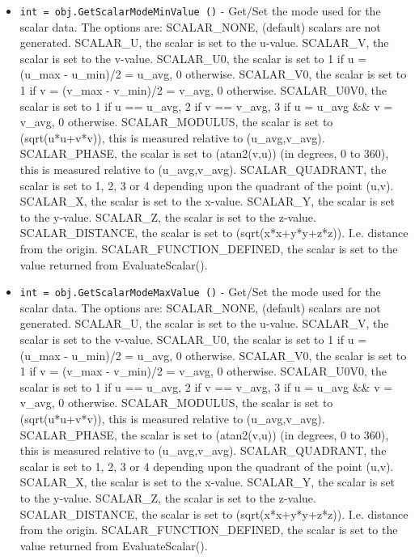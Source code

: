 \begin{itemize}
\item  \verb|int = obj.GetScalarModeMinValue ()| -  Get/Set the mode used for the scalar data.  The options are:
 SCALAR\_NONE, (default) scalars are not generated.
 SCALAR\_U, the scalar is set to the u-value. 
 SCALAR\_V, the scalar is set to the v-value.
 SCALAR\_U0, the scalar is set to 1 if u = (u\_max - u\_min)/2 = u\_avg, 0 otherwise.
 SCALAR\_V0, the scalar is set to 1 if v = (v\_max - v\_min)/2 = v\_avg, 0 otherwise.
 SCALAR\_U0V0, the scalar is 
   set to 1 if u == u\_avg, 2 if v == v\_avg, 3 if u = u\_avg \&\& v = v\_avg, 0 otherwise.
 SCALAR\_MODULUS, the scalar is set to (sqrt(u*u+v*v)), this is measured relative to (u\_avg,v\_avg).
 SCALAR\_PHASE, the scalar is set to (atan2(v,u)) (in degrees, 0 to 360), this is measured relative to (u\_avg,v\_avg).
 SCALAR\_QUADRANT, the scalar is set to 1, 2, 3 or 4 
   depending upon the quadrant of the point (u,v).
 SCALAR\_X, the scalar is set to the x-value. 
 SCALAR\_Y, the scalar is set to the y-value. 
 SCALAR\_Z, the scalar is set to the z-value. 
 SCALAR\_DISTANCE, the scalar is set to (sqrt(x*x+y*y+z*z)). I.e. distance from the origin.
 SCALAR\_FUNCTION\_DEFINED, the scalar is set to the value returned from EvaluateScalar().

\item  \verb|int = obj.GetScalarModeMaxValue ()| -  Get/Set the mode used for the scalar data.  The options are:
 SCALAR\_NONE, (default) scalars are not generated.
 SCALAR\_U, the scalar is set to the u-value. 
 SCALAR\_V, the scalar is set to the v-value.
 SCALAR\_U0, the scalar is set to 1 if u = (u\_max - u\_min)/2 = u\_avg, 0 otherwise.
 SCALAR\_V0, the scalar is set to 1 if v = (v\_max - v\_min)/2 = v\_avg, 0 otherwise.
 SCALAR\_U0V0, the scalar is 
   set to 1 if u == u\_avg, 2 if v == v\_avg, 3 if u = u\_avg \&\& v = v\_avg, 0 otherwise.
 SCALAR\_MODULUS, the scalar is set to (sqrt(u*u+v*v)), this is measured relative to (u\_avg,v\_avg).
 SCALAR\_PHASE, the scalar is set to (atan2(v,u)) (in degrees, 0 to 360), this is measured relative to (u\_avg,v\_avg).
 SCALAR\_QUADRANT, the scalar is set to 1, 2, 3 or 4 
   depending upon the quadrant of the point (u,v).
 SCALAR\_X, the scalar is set to the x-value. 
 SCALAR\_Y, the scalar is set to the y-value. 
 SCALAR\_Z, the scalar is set to the z-value. 
 SCALAR\_DISTANCE, the scalar is set to (sqrt(x*x+y*y+z*z)). I.e. distance from the origin.
 SCALAR\_FUNCTION\_DEFINED, the scalar is set to the value returned from EvaluateScalar().


\end{itemize}
